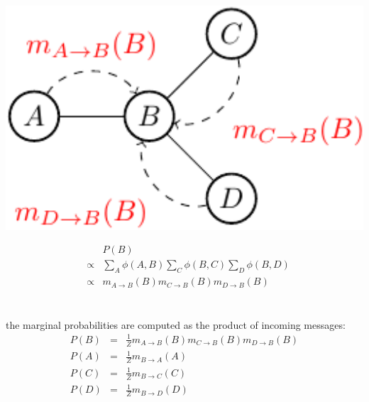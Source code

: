 \begin{minipage}[c]{0.4\textwidth}
      \centering
      \includegraphics[width=1.1\textwidth]{./Figures/message_passing_3}
\end{minipage}
\begin{minipage}[c]{0.6\textwidth}
 \begin{equation*}
  \begin{array}{rcl}
  & & P(B) \\
  &\propto& \sum_{A}\phi(A,B) \sum_C \phi(B,C) \sum_D \phi(B,D)\\  
  &\propto& m_{A\rightarrow B}(B) m_{C\rightarrow B} (B) m_{D\rightarrow B}(B)  \\
  \end{array}
 \end{equation*}
\end{minipage}\\

 the marginal probabilities are computed as the product of incoming messages:
  \begin{equation*}
  \begin{array}{rcl}
   P(B)&=&\frac{1}{Z}m_{A\rightarrow B}(B) m_{C\rightarrow B} (B) m_{D\rightarrow B}(B)\\
   P(A)&=&\frac{1}{Z}m_{B\rightarrow A}(A) \\
   P(C)&=&\frac{1}{Z}m_{B\rightarrow C}(C) \\
   P(D)&=&\frac{1}{Z}m_{B\rightarrow D}(D) 
  \end{array}
 \end{equation*}

